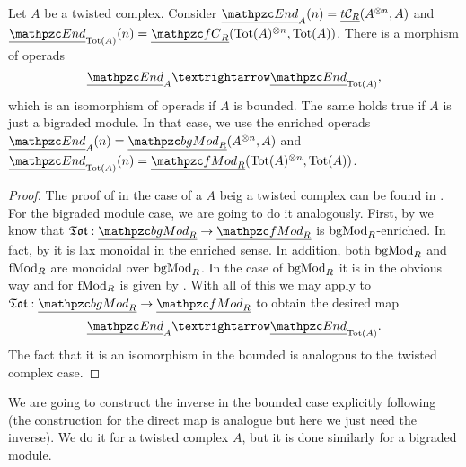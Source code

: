 \documentclass[Thesis.tex]{subfiles}
\begin{document}
\begin{lem}\label{inverse}
Let $A$ be a twisted complex. Consider $\uEnd_A(n)=\utC(A^{\otimes n},A)$ and $\uEnd_{\Tot(A)}(n)=\ufC(\Tot(A)^{\otimes n},\Tot(A))$. There is a morphism of operads
\[\uEnd_A →\uEnd_{\Tot(A)},\]
which is an isomorphism of operads if $A$ is bounded. The same holds true if $A$ is just a bigraded module. In that case, we use the enriched operads $\uEnd_A(n)=\ubgMod(A^{\otimes n},A)$ and $\uEnd_{\Tot(A)}(n)=\ufMod(\Tot(A)^{\otimes n},\Tot(A))$.
\end{lem}
\begin{proof}
The proof of in the case of a $A$ beig a twisted complex can be found in \cite[Lemma 4.54]{whitehouse}. For the bigraded module case, we are going to do it analogously. First, by  we know that $\mathfrak{Tot}:\ubgMod\to\ufMod$ is $\mathrm{bgMod}_R$-enriched. In fact, by  it is lax monoidal in the enriched sense. In addition, both $\mathrm{bgMod}_R$ and $\mathrm{fMod}_R$ are monoidal over $\mathrm{bgMod}_R$. In the case of $\mathrm{bgMod}_R$ it is in the obvious way and for $\mathrm{fMod}_R$ is given by . With all of this we may apply  to $\mathfrak{Tot}:\ubgMod\to\ufMod$ to obtain the desired map
\[\uEnd_A →\uEnd_{\Tot(A)}.\]
 The fact that it is an isomorphism in the bounded is analogous to the twisted complex case. 
\end{proof}

We are going to construct the inverse in the bounded case explicitly following  (the construction for the direct map is analogue but here we just need the inverse). We do it for a twisted complex $A$, but it is done similarly for a bigraded module.
\end{document}
